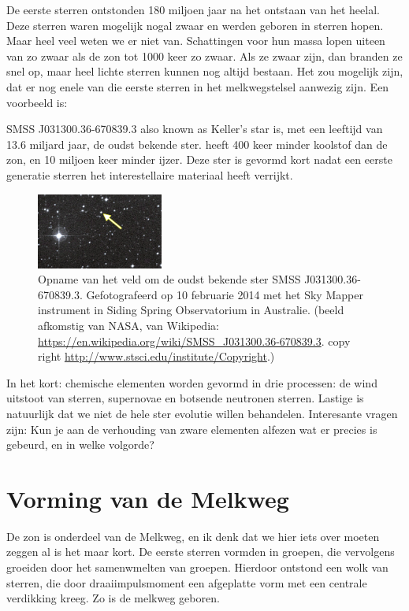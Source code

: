 \documentclass[11pt,fleqn]{book} %
\begin{document}
De eerste sterren ontstonden 180 miljoen jaar na het ontstaan van het
heelal. Deze sterren waren mogelijk nogal
zwaar en werden geboren in sterren hopen. Maar heel veel weten we er
niet van. Schattingen voor hun massa lopen uiteen van zo zwaar als de
zon tot 1000 keer zo zwaar. Als ze zwaar zijn, dan branden ze snel op,
maar heel lichte sterren kunnen nog altijd bestaan. Het zou mogelijk
zijn, dat er nog enele van die eerste sterren in het melkwegstelsel
aanwezig zijn. Een voorbeeld is: 

SMSS J031300.36-670839.3 also known as Keller's star is, met een
leeftijd van 13.6 miljard jaar, de oudst bekende ster.  heeft 400 keer
minder koolstof dan de zon, en 10 miljoen keer minder ijzer.  Deze
ster is gevormd kort nadat een eerste generatie sterren het
interestellaire materiaal heeft verrijkt.

\begin{figure}[h]
    \centering
    \includegraphics[width=0.37\textwidth]{Pictures/OldestStar-SM0313-SMSSJ031300366708393-20140210.png}
    \caption{Opname van het veld om de oudst bekende ster SMSS
      J031300.36-670839.3.  Gefotografeerd op 10 februarie 2014 met
      het Sky Mapper instrument in Siding Spring Observatorium in
      Australie.  (beeld afkomstig van NASA, van Wikipedia:
      \url{https://en.wikipedia.org/wiki/SMSS_J031300.36-670839.3}.
      copy right \url{http://www.stsci.edu/institute/Copyright}.) }
    \label{fig:pca}
\end{figure}

In het kort: chemische elementen worden gevormd in drie processen: de
wind uitstoot van sterren, supernovae en botsende neutronen sterren.
Lastige is natuurlijk dat we niet de hele ster evolutie willen
behandelen.  Interesante vragen zijn: Kun je aan de verhouding van
zware elementen alfezen wat er precies is gebeurd, en in welke
volgorde?

\section{Vorming van de Melkweg}

De zon is onderdeel van de Melkweg, en ik denk dat we hier iets over
moeten zeggen al is het maar kort.  De eerste sterren vormden in
groepen, die vervolgens groeiden door het samenwmelten van
groepen. Hierdoor ontstond een wolk van sterren, die door
draaiimpulsmoment een afgeplatte vorm met een centrale verdikking
kreeg. Zo is de melkweg geboren.
\end{document}
